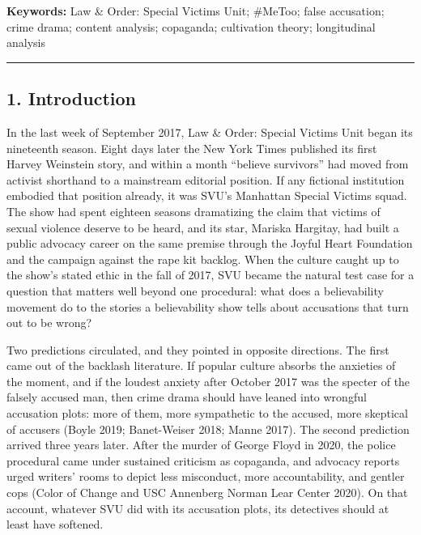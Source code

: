 \documentclass[
]{article}
\begin{document}
\textbf{Keywords:} Law \& Order: Special Victims Unit; \#MeToo; false
accusation; crime drama; content analysis; copaganda; cultivation
theory; longitudinal analysis

\begin{center}\rule{0.5\linewidth}{0.5pt}\end{center}

\subsection{1. Introduction}\label{introduction}

In the last week of September 2017, Law \& Order: Special Victims Unit
began its nineteenth season. Eight days later the New York Times
published its first Harvey Weinstein story, and within a month ``believe
survivors'' had moved from activist shorthand to a mainstream editorial
position. If any fictional institution embodied that position already,
it was SVU's Manhattan Special Victims squad. The show had spent
eighteen seasons dramatizing the claim that victims of sexual violence
deserve to be heard, and its star, Mariska Hargitay, had built a public
advocacy career on the same premise through the Joyful Heart Foundation
and the campaign against the rape kit backlog. When the culture caught
up to the show's stated ethic in the fall of 2017, SVU became the
natural test case for a question that matters well beyond one
procedural: what does a believability movement do to the stories a
believability show tells about accusations that turn out to be wrong?

Two predictions circulated, and they pointed in opposite directions. The
first came out of the backlash literature. If popular culture absorbs
the anxieties of the moment, and if the loudest anxiety after October
2017 was the specter of the falsely accused man, then crime drama should
have leaned into wrongful accusation plots: more of them, more
sympathetic to the accused, more skeptical of accusers (Boyle 2019;
Banet-Weiser 2018; Manne 2017). The second prediction arrived three
years later. After the murder of George Floyd in 2020, the police
procedural came under sustained criticism as copaganda, and advocacy
reports urged writers' rooms to depict less misconduct, more
accountability, and gentler cops (Color of Change and USC Annenberg
Norman Lear Center 2020). On that account, whatever SVU did with its
accusation plots, its detectives should at least have softened.
\end{document}
